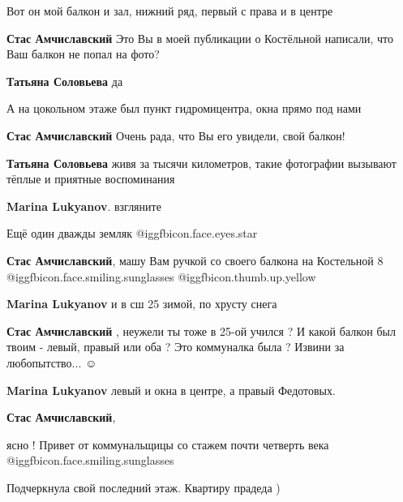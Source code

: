  
 
 
 
 

Вот он мой балкон и зал, нижний ряд, первый с права и в центре

\textbf{Стас Амчиславский} Это Вы в моей публикации о Костёльной написали, что Ваш балкон не попал на фото?

\textbf{Татьяна Соловьева} да

А на цокольном этаже был пункт гидромицентра, окна прямо под нами

\textbf{Стас Амчиславский} Очень рада, что Вы его увидели, свой балкон!

\textbf{Татьяна Соловьева} живя за тысячи километров, такие фотографии вызывают тёплые и приятные воспоминания

\textbf{Marina Lukyanov}. взгляните


Ещё один дважды земляк  @igg{fbicon.face.eyes.star} 

\textbf{Стас Амчиславский}, машу Вам ручкой со своего балкона на Костельной 8
@igg{fbicon.face.smiling.sunglasses}  @igg{fbicon.thumb.up.yellow} 

\textbf{Marina Lukyanov} и в сш 25 зимой, по хрусту снега

\textbf{Стас Амчиславский} , неужели ты тоже в 25-ой учился ?
И какой балкон был твоим - левый, правый или оба ? Это коммуналка была ?
Извини за любопытство... ☺ ️ 

\textbf{Marina Lukyanov} левый и окна в центре, а правый Федотовых.

\textbf{Стас Амчиславский}, 

ясно ! Привет от коммунальщицы со стажем почти четверть века
@igg{fbicon.face.smiling.sunglasses} 

Подчеркнула свой последний этаж. Квартиру прадеда )

